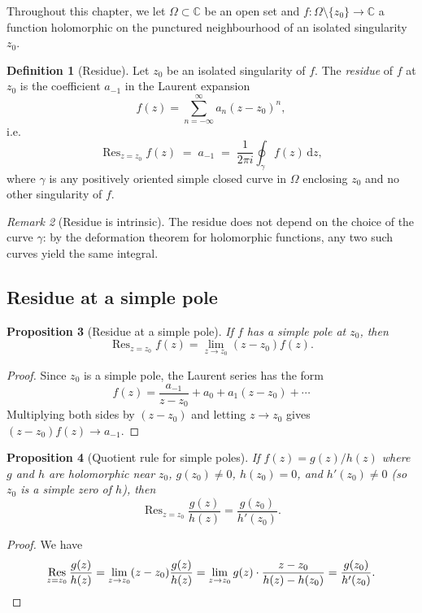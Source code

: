 \documentclass[12pt,a4paper,openany]{book}
\theoremstyle{definition}
\newtheorem{definition}{Definition}[chapter]
\theoremstyle{plain}
\newtheorem{proposition}[definition]{Proposition}
\theoremstyle{remark}
\newtheorem{remark}[definition]{Remark}
\newcommand{\C}{\mathbb{C}}
\DeclareMathOperator{\Res}{Res}
\newcommand{\dd}{\mathrm{d}}
\begin{document}
Throughout this chapter, we let $\Omega\subset\C$ be an open set and
$f\colon\Omega\setminus\{z_0\}\to\C$ a function holomorphic on the
punctured neighbourhood of an isolated singularity $z_0$.

\begin{definition}[Residue]\label{def:residue}
Let $z_0$ be an isolated singularity of $f$.  The \emph{residue} of $f$
at $z_0$ is the coefficient $a_{-1}$ in the Laurent expansion
\[
  f(z)=\sum_{n=-\infty}^{\infty}a_n(z-z_0)^n,
\]
i.e.\
\[
  \Res_{z=z_0}f(z)\;=\;a_{-1}
  \;=\;\frac{1}{2\pi i}\oint_{\gamma}f(z)\,\dd z,
\]
where $\gamma$ is any positively oriented simple closed curve in $\Omega$
enclosing $z_0$ and no other singularity of $f$.
\end{definition}

\begin{remark}[Residue is intrinsic]\label{rem:residue-intrinsic}
The residue does not depend on the choice of the curve $\gamma$: by the
deformation theorem for holomorphic functions, any two such curves yield
the same integral.
\end{remark}

\subsection{Residue at a simple pole}

\begin{proposition}[Residue at a simple pole]\label{prop:res-simple}
If $f$ has a simple pole at $z_0$, then
\[
  \Res_{z=z_0}f(z)=\lim_{z\to z_0}(z-z_0)f(z).
\]
\end{proposition}

\begin{proof}
Since $z_0$ is a simple pole, the Laurent series has the form
\[
  f(z)=\frac{a_{-1}}{z-z_0}+a_0+a_1(z-z_0)+\cdots
\]
Multiplying both sides by $(z-z_0)$ and letting $z\to z_0$ gives
$(z-z_0)f(z)\to a_{-1}$.
\end{proof}

\begin{proposition}[Quotient rule for simple poles]\label{prop:res-quotient}
If $f(z)=g(z)/h(z)$ where $g$ and $h$ are holomorphic near $z_0$,
$g(z_0)\neq 0$, $h(z_0)=0$, and $h'(z_0)\neq 0$ (so $z_0$ is a simple
zero of $h$), then
\[
  \Res_{z=z_0}\frac{g(z)}{h(z)}=\frac{g(z_0)}{h'(z_0)}.
\]
\end{proposition}

\begin{proof}
We have
\[
  \Res_{z=z_0}\frac{g(z)}{h(z)}
  =\lim_{z\to z_0}(z-z_0)\frac{g(z)}{h(z)}
  =\lim_{z\to z_0}g(z)\cdot\frac{z-z_0}{h(z)-h(z_0)}
  =\frac{g(z_0)}{h'(z_0)}.  \qedhere
\]
\end{proof}
\end{document}
